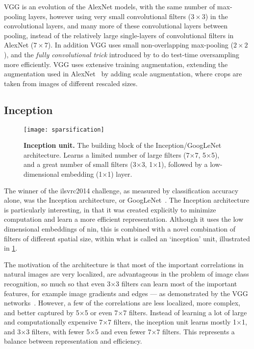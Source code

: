 \documentclass[thesis]{subfiles}
\begin{document}
VGG is an evolution of the AlexNet models, with the same number of max-pooling layers, however using very small convolutional filters ($3 \times 3$) in the convolutional layers, and many more of these convolutional layers between pooling, instead of the relatively large single-layers of convolutional filters in AlexNet ($7\times 7$). In addition VGG uses small non-overlapping max-pooling ($2\times 2$), and the \emph{fully convolutional trick} introduced by \citet{Sermanet2013overfeat} to do test-time oversampling more efficiently. VGG uses extensive training augmentation, extending the augmentation used in AlexNet~\citep{Krizhevsky2012} by adding scale augmentation, where crops are taken from images of different rescaled sizes. 

\subsection{Inception}
\begin{figure}
	\centering
	\texttt{[image: sparsification]}
	\caption[Illustration of the Inception unit]{\textbf{Inception unit.} The building block of the Inception/GoogLeNet architecture. Learns a limited number of large filters (7$\times$7, 5$\times$5), and a great number of small filters (3$\times$3, 1$\times$1), followed by a low-dimensional embedding (1$\times$1) layer.}\label{fig:inceptionunit}
\end{figure}
The winner of the \gls{ilsvrc}2014 challenge, as measured by classification accuracy alone, was the Inception architecture, or GoogLeNet~\citep{Szegedy2014going}. The Inception architecture is particularly interesting, in that it was created explicitly to minimize computation and learn a more efficient representation. Although it uses the low dimensional embeddings of \gls{nin}, this is combined with a novel combination of filters of different spatial size, within what is called an `inception' unit, illustrated in \cref{fig:inceptionunit}.

The motivation of the architecture is that most of the important correlations in natural images are very localized, are advantageous in the problem of image class recognition, so much so that even 3$\times$3 filters can learn most of the important features, for example image gradients and edges --- as demonstrated by the VGG networks~\citep{Simonyan2014verydeep}. However, a few of the correlations are less localized, more complex, and better captured by 5$\times$5 or even 7$\times$7 filters. Instead of learning a lot of large and computationally expensive 7$\times$7 filters, the inception unit learns mostly 1$\times$1, and 3$\times$3 filters, with fewer 5$\times$5 and even fewer 7$\times$7 filters. This represents a balance between representation and efficiency.
\end{document}
